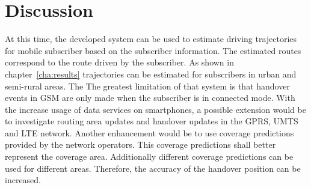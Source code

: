 \documentclass[master,english]{hgbthesis}
\begin{document}
\section{Discussion}
At this time, the developed system can be used to estimate driving trajectories for mobile subscriber based on the subscriber information. The estimated routes correspond to the route driven by the subscriber. As shown in chapter~\ref{cha:results} trajectories can be estimated for subscribers in urban and semi-rural areas.
The 
The greatest limitation of that system is that handover events in GSM are only made when the subscriber is in connected mode. With the increase usage of data services on smartphones, a possible extension would be to investigate routing area updates and handover updates in the GPRS, UMTS and LTE network.
Another enhancement would be to use coverage predictions provided by the network operators. This coverage predictions shall better represent the coverage area. Additionally different coverage predictions can be used for different areas. Therefore, the accuracy of the handover position can be increased. %


\MakeBibliography
\end{document}
